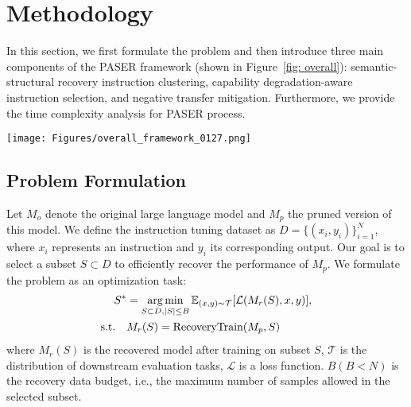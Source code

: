 \section{Methodology}
In this section, we first formulate the problem and then introduce three main components of the PASER framework (shown in Figure~\ref{fig: overall}): semantic-structural recovery instruction clustering,  capability degradation-aware instruction selection, and negative transfer mitigation. Furthermore, we provide the time complexity analysis for PASER process.

\begin{figure*}[]
    \centering
    \texttt{[image: Figures/overall\_framework\_0127.png]}
    \caption{Overall Framework for our proposed PASER recovery data selection framework.}
   \label{fig: overall}
    \vspace{-0.3cm}
\end{figure*}

\subsection{Problem Formulation}
Let $M_o$ denote the original large language model and $M_p$ the pruned version of this model. We define the instruction tuning dataset as $D = \{(x_i, y_i)\}_{i=1}^N$, where $x_i$ represents an instruction and $y_i$ its corresponding output. Our goal is to select a subset $S \subset D$ to efficiently recover the performance of $M_p$. We formulate the problem as an optimization task:
\begin{equation}
\begin{aligned}
    S^* &= \operatorname*{arg\,min}_{S \subset D, |S| \leq B} \mathbb{E}_{(x,y) \sim \mathcal{T}} [\mathcal{L}(M_r(S), x, y)],\\
    \text{s.t.}\quad &M_r(S) = \text{RecoveryTrain}(M_p, S) 
\end{aligned}    
\end{equation}
\vspace{-2mm}
where $M_r(S)$ is the recovered model after training on subset $S$, $\mathcal{T}$ is the distribution of downstream evaluation tasks, $\mathcal{L}$ is a loss function. $B (B < N)$ is the recovery data budget, i.e., the maximum number of samples allowed in the selected subset.

